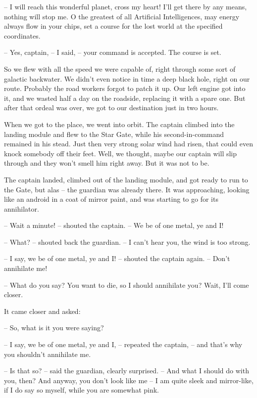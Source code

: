 \documentclass[ebook,oneside,final,openright]{memoir}
\begin{document}
– I will reach this wonderful planet, cross my heart! I’ll get there by any means, nothing will stop me. O the greatest of all Artificial Intelligences, may energy always flow in your chips, set a course for the lost world at the specified coordinates.\par
– Yes, captain, – I said, – your command is accepted. The course is set.\par
So we flew with all the speed we were capable of, right through some sort of galactic backwater. We didn’t even notice in time a deep black hole, right on our route. Probably the road workers forgot to patch it up. Our left engine got into it, and we wasted half a day on the roadside, replacing it with a spare one. But after that ordeal was over, we got to our destination just in two hours.\par
\par
When we got to the place, we went into orbit. The captain climbed into the landing module and flew to the Star Gate, while his second-in-command remained in his stead. Just then very strong solar wind had risen, that could even knock somebody off their feet. Well, we thought, maybe our captain will slip through and they won’t smell him right away. But it was not to be.\par
\par
The captain landed, climbed out of the landing module, and got ready to run to the Gate, but alas – the guardian was already there. It was approaching, looking like an android in a coat of mirror paint, and was starting to go for its annihilator.\par
– Wait a minute! – shouted the captain. – We be of one metal, ye and I!\par
– What? – shouted back the guardian. – I can’t hear you, the wind is too strong.\par
– I say, we be of one metal, ye and I! – shouted the captain again. – Don’t annihilate me!\par
– What do you say? You want to die, so I should annihilate you? Wait, I’ll come closer.\par
\par
It came closer and asked:\par
– So, what is it you were saying?\par
– I say, we be of one metal, ye and I, – repeated the captain, – and that’s why you shouldn’t annihilate me.\par
– Is that so? – said the guardian, clearly surprised. – And what I should do with you, then? And anyway, you don’t look like me – I am quite sleek and mirror-like, if I do say so myself, while you are somewhat pink.\par
\end{document}
